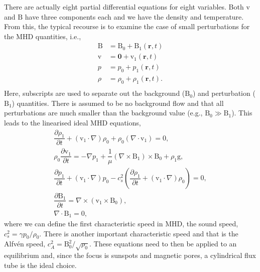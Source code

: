     There are actually eight partial differential equations for eight variables.
    Both $\boldsymbol{\mathrm{v}}$ and $\boldsymbol{\mathrm{B}}$ have three components each and we have the density and temperature.
    From this, the typical recourse is to examine the case of small perturbations for the MHD quantities, i.e.,
    \begin{align*}                                                         
        \boldsymbol{\mathrm{B}} &= \boldsymbol{\mathrm{B}}_0 + \boldsymbol{\mathrm{B}}_1(\boldsymbol{r},t)\\               
        \boldsymbol{\mathrm{v}} &= \boldsymbol{0} + \boldsymbol{\mathrm{v}}_1(\boldsymbol{r},t)\\               
        p &= p_0 + {p_1}(\boldsymbol{r},t)\\               
        \rho &= \rho_0 + {\rho_1}(\boldsymbol{r},t).\\              
    \end{align*}
    Here, subscripts are used to separate out the background ($\mathrm{B}_0$) and perturbation ($\mathrm{B}_1$) quantities.
    There is assumed to be no background flow and that all perturbations are much smaller than the background value (e.g., $\mathrm{B}_0 \gg \mathrm{B}_1$).      
    This leads to the linearised ideal MHD equations,
    \begin{align}                                                         
    \dfrac{\partial \rho_1 }{\partial t} + (\boldsymbol{\mathrm{v}}_1 \cdot \nabla)\rho_0 + \rho_0 (\nabla \cdot \boldsymbol{\mathrm{v}}_1) =       
    0,\tag{Mass Conservation}\\                                  
    \rho_0 \dfrac{\partial \boldsymbol{\mathrm{v}}_1}{\partial t} =
    -\nabla p_1 + \dfrac{1}{\mu}(\nabla \times \boldsymbol{\mathrm{B}}_1) \times \boldsymbol{\mathrm{B}}_0 + \rho_1 \boldsymbol{\mathrm{g}},\tag{Equation of Motion}\\
    \dfrac{\partial p_1}{\partial t} + (\boldsymbol{\mathrm{v}}_1 \cdot \nabla)p_0 - c_s^2 \left( \dfrac{\partial \rho_1}{\partial t} + (\boldsymbol{\mathrm{v}}_1 \cdot \nabla)\rho_0 \right) = 0,\tag{Energy Equation}\\       
    \dfrac{\partial \boldsymbol{\mathrm{B}}_1}{\partial t} = \nabla \times (\boldsymbol{\mathrm{v}}_1 \times \boldsymbol{\mathrm{B}}_0),\tag{Induction Equation}\\
    \nabla \cdot \boldsymbol{\mathrm{B}}_1 = 0, \tag{Solenoid Equation}               
    \end{align}
    where we can define the first characteristic speed in MHD, the sound speed, $c_s^2 = {\gamma p_0}/{\rho_0}$.
    There is another important characteristic speed and that is the Alfv\'{e}n speed, $c_A^2 = {\mathrm{B}_0^2}/{\sqrt{\rho_0}}$.
    These equations need to then be applied to an equilibrium and, since the focus is sunspots and magnetic pores, a cylindrical flux tube is the ideal choice.
    
